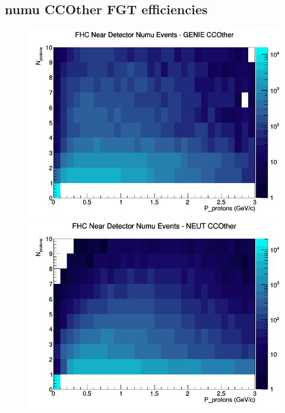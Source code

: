 \subsection{numu CCOther FGT efficiencies}
\begin{figure}[h]
\includegraphics[width=\linewidth]{N_P/nominal/protons/CCOther_FHC_ND_numu_N_P_GENIE.png}
\endminipage
{}
\includegraphics[width=\linewidth]{N_P/nominal/protons/CCOther_FHC_ND_numu_N_P_NEUT.png}
\endminipage
{}

\end{figure}
